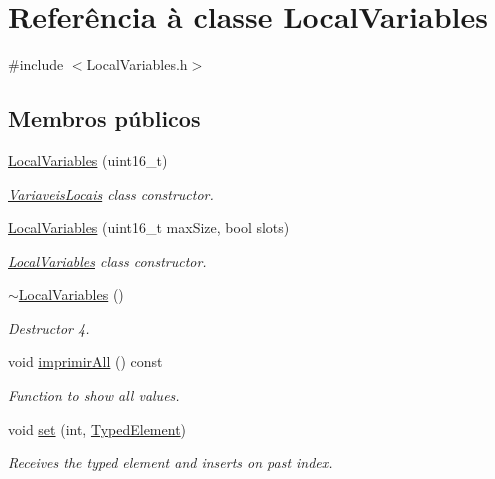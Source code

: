 \hypertarget{classLocalVariables}{}\section{Referência à classe Local\+Variables}
\label{classLocalVariables}


{\ttfamily \#include $<$Local\+Variables.\+h$>$}

\subsection*{Membros públicos}
\begin{DoxyCompactItemize}
\item 
\hyperlink{classLocalVariables_ae354d02f996f4f584fe857d9304161c1}{Local\+Variables} (uint16\+\_\+t)
\begin{DoxyCompactList}\small\item\em \hyperlink{classVariaveisLocais}{Variaveis\+Locais} class constructor. \end{DoxyCompactList}\item 
\hyperlink{classLocalVariables_a2c9e8aefc8aa8ff0d0efd305ab3e424b}{Local\+Variables} (uint16\+\_\+t max\+Size, bool slots)
\begin{DoxyCompactList}\small\item\em \hyperlink{classLocalVariables}{Local\+Variables} class constructor. \end{DoxyCompactList}\item 
\hyperlink{classLocalVariables_aaf00f6cc3391fdd2cc0ecd2b1d31c887}{$\sim$\+Local\+Variables} ()
\begin{DoxyCompactList}\small\item\em Destructor 4. \end{DoxyCompactList}\item 
void \hyperlink{classLocalVariables_a6f51e8532ae59a4eea6801872d5f8444}{imprimir\+All} () const
\begin{DoxyCompactList}\small\item\em Function to show all values. \end{DoxyCompactList}\item 
void \hyperlink{classLocalVariables_a6d79e0c874931e97ed68a25cf60ab119}{set} (int, \hyperlink{BasicTypes_8h_a97b332303b1262282599e6ede0637b82}{Typed\+Element})
\begin{DoxyCompactList}\small\item\em Receives the typed element and inserts on past index. \end{DoxyCompactList}\item 

\end{DoxyCompactItemize}
